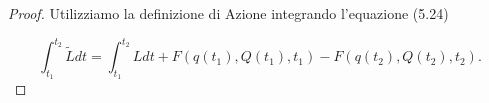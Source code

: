 \begin{proof}
Utilizziamo la definizione di Azione integrando l'equazione (5.24)

\begin{equation*}
	\int_{t_1}^{t_2} \tilde{L} d t=\int_{t_1}^{t_2} L d t+F\left(q\left(t_1\right), Q\left(t_1\right), t_1\right)-F\left(q\left(t_2\right), Q\left(t_2\right), t_2\right) .
\end{equation*} 



\end{proof}








 